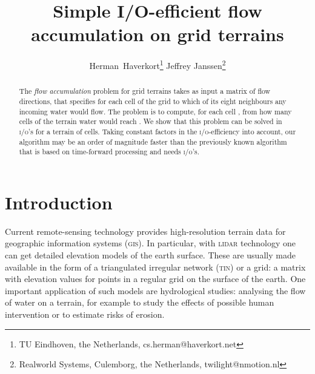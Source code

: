 \documentclass[10pt,a4paper]{article}
\title{Simple I/O-efficient flow accumulation on grid terrains}
\author{Herman~Haverkort\thanks{TU Eindhoven, the Netherlands, cs.herman@haverkort.net}
\hspace{.3cm}
Jeffrey Janssen\thanks{Realworld Systems, Culemborg, the Netherlands, twilight@nmotion.nl}
}
\date{}
\def\tin{\textsc{tin}\xspace}
\def\gis{\textsc{gis}\xspace}
\def\lidar{\textsc{lidar}\xspace}
\def\io{\textsc{i/o}\xspace}
\def\ios{\textsc{i/o}'s\xspace}
\begin{document}
\maketitle

\begin{abstract}
The \emph{flow accumulation} problem for grid terrains takes as input a matrix of flow directions, that specifies for each cell of the grid to which of its eight neighbours any incoming water would flow. The problem is to compute, for each cell , from how many cells of the terrain water would reach . We show that this problem can be solved in  \ios for a terrain of  cells. Taking constant factors in the \io-efficiency into account, our algorithm may be an order of magnitude faster than the previously known algorithm that is based on time-forward processing and needs  \ios.
\end{abstract}

\section{Introduction}
Current remote-sensing technology provides high-resolution terrain data for geographic information systems (\gis). In particular, with \lidar technology one can get detailed elevation models of the earth surface. These are usually made available in the form of a triangulated irregular network (\tin) or a grid: a matrix with elevation values for points in a regular grid on the surface of the earth. One important application of such models are hydrological studies: analysing the flow of water on a terrain, for example to study the effects of possible human intervention or to estimate risks of erosion.
\end{document}
